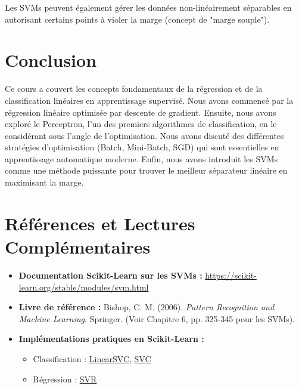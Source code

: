 \documentclass[12pt]{article}
\begin{document}
Les SVMs peuvent également gérer les données non-linéairement séparables en autorisant certains points à violer la marge (concept de "marge souple").

\section{Conclusion}
Ce cours a couvert les concepts fondamentaux de la régression et de la classification linéaires en apprentissage supervisé. Nous avons commencé par la régression linéaire optimisée par descente de gradient. Ensuite, nous avons exploré le Perceptron, l'un des premiers algorithmes de classification, en le considérant sous l'angle de l'optimisation. Nous avons discuté des différentes stratégies d'optimisation (Batch, Mini-Batch, SGD) qui sont essentielles en apprentissage automatique moderne. Enfin, nous avons introduit les SVMs comme une méthode puissante pour trouver le meilleur séparateur linéaire en maximisant la marge.

\section{Références et Lectures Complémentaires}

\begin{itemize}
    \item \textbf{Documentation Scikit-Learn sur les SVMs :}
    \href{https://scikit-learn.org/stable/modules/svm.html}{https://scikit-learn.org/stable/modules/svm.html}

    \item \textbf{Livre de référence :} Bishop, C. M. (2006). \textit{Pattern Recognition and Machine Learning}. Springer. (Voir Chapitre 6, pp. 325-345 pour les SVMs).

    \item \textbf{Implémentations pratiques en Scikit-Learn :}
    \begin{itemize}
        \item Classification : \href{https://scikit-learn.org/stable/modules/generated/sklearn.svm.LinearSVC.html}{LinearSVC}, \href{https://scikit-learn.org/stable/modules/generated/sklearn.svm.SVC.html}{SVC}
        \item Régression : \href{https://scikit-learn.org/stable/modules/generated/sklearn.svm.SVR.html}{SVR}
    \end{itemize}
\end{itemize}
\end{document}
